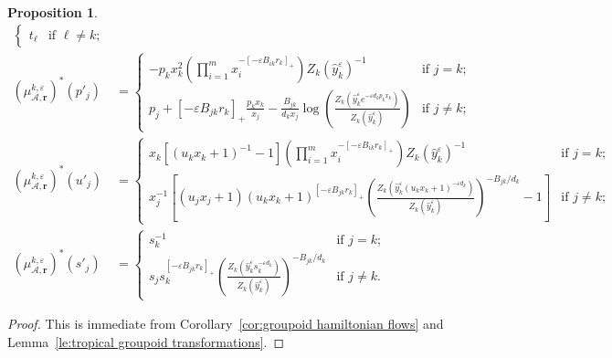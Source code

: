 \documentclass{amsart}
\newtheorem{proposition}[theorem]{Proposition}
\numberwithin{equation}{section}
\newcommand{\bfr}{{\boldsymbol{r}}}
\newcommand{\cA}{\mathcal{A}}
\begin{document}
\begin{proposition}
\begin{align}
\begin{cases}
      t_\ell & \text{if $\ell\ne k$;}
    \end{cases}\\
    \label{eq:GA mutation}
    (\mu_{\cA,\bfr}^{k,\varepsilon})^*(p'_j)&=
    \begin{cases} 
      -p_k x_k^2 \left(\prod_{i=1}^m x_i^{-[-\varepsilon B_{ik} r_k]_+}\right) Z_k(\hat y_k^\varepsilon)^{-1} & \text{if $j=k$;}\\ 
      p_j + [-\varepsilon B_{jk} r_k]_+ \frac{p_k x_k}{x_j} - \frac{B_{jk}}{d_k x_j}\log\left(\frac{Z_k\left(\hat y_k^\varepsilon e^{-\varepsilon d_kp_kx_k}\right)}{Z_k(\hat y_k^\varepsilon)}\right) & \text{if $j\ne k$;}
    \end{cases}\\
    \label{eq:BA mutation}
    (\mu_{\cA,\bfr}^{k,\varepsilon})^*(u'_j)
    &=\begin{cases}
      x_k \left[ (u_k x_k +1)^{-1} -1\right] \left(\prod_{i=1}^m x_i^{-[-\varepsilon B_{ik} r_k]_+}\right) Z_k(\hat y_k^\varepsilon)^{-1} & \text{if $j=k$;}\\ 
      x_j^{-1} \left[ (u_j x_j + 1) (u_k x_k + 1)^{[-\varepsilon B_{jk} r_k]_+} \left(\frac{Z_k\left(\hat y_k^\varepsilon (u_k x_k +1)^{-\varepsilon d_k}\right)}{Z_k(\hat y_k^\varepsilon)}\right)^{-B_{jk}/d_k} - 1\right] & \text{if $j\ne k$;}
    \end{cases}\\
    \label{eq:DA mutation}
    (\mu_{\cA,\bfr}^{k,\varepsilon})^*(s'_j)
    &=\begin{cases} 
      s_k^{-1} & \text{if $j=k$;}\\ 
      s_j s_k^{[-\varepsilon B_{jk} r_k]_+} \left(\frac{Z_k\left(\hat y_k^\varepsilon s_k^{-\varepsilon d_k}\right)}{Z_k(\hat y_k^\varepsilon)}\right)^{-B_{jk}/d_k} & \text{if $j\ne k$.}
    \end{cases}
  \end{align}
\end{proposition}
\begin{proof}
  This is immediate from Corollary~\ref{cor:groupoid hamiltonian flows} and Lemma~\ref{le:tropical groupoid transformations}.
\end{proof}
\end{document}
